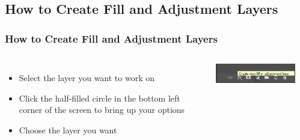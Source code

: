 \documentclass{beamer}
\begin{document}
\subsection{How to Create Fill and Adjustment Layers}
\begin{frame}
	\frametitle{How to Create Fill and Adjustment Layers}
		\begin{columns}
		\vspace{-15pt}
	\begin{itemize}
		\item Select the layer you want to work on
		\item Click the half-filled circle in the bottom left corner of the screen to bring up your options
		\item Choose the layer you want
	\end{itemize}
\includegraphics[width = 1.0\textwidth]{images/fill1.png}
	\begin{center}

\end{center}
\end{columns}
\end{frame}
\end{document}
